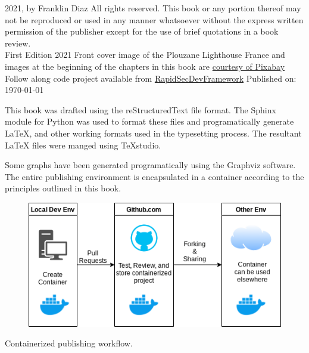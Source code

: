 \justify
\textcopyright{} 2021, by Franklin Diaz
\justify
All rights reserved. This book or any portion thereof
may not be reproduced or used in any manner whatsoever
without the express written permission of the publisher
except for the use of brief quotations in a book review.
\vspace{5mm}\\
First Edition 2021
\justify
Front cover image of the Plouzane Lighthouse France and images
at the beginning of the chapters in this book are
\href{https://pixabay.com/service/terms/#license}{courtesy of Pixabay}
\justify
Follow along code project available from {\href{https://github.com/hotpeppersec/rapid_secdev_framework}{RapidSecDevFramework}}
\vspace{3mm}
Published on: \today

\justify
This book was drafted using the reStructuredText file format. 
The Sphinx module for Python was used to format these files and programatically
generate LaTeX, and other working formats used in the typesetting process. The
resultant LaTeX files were manged using TeXstudio.

Some graphs have been generated programatically using the Graphviz software. 
The entire publishing environment is encapsulated in a container according
to the principles outlined in this book.

\vspace{5mm}
    \centering
\vspace{0mm}
\begin{figure}[!htb]
	\centering
	\includegraphics[scale=0.75]{../images/workflow.png}
\end{figure}
\vspace{2mm}
Containerized publishing workflow.
